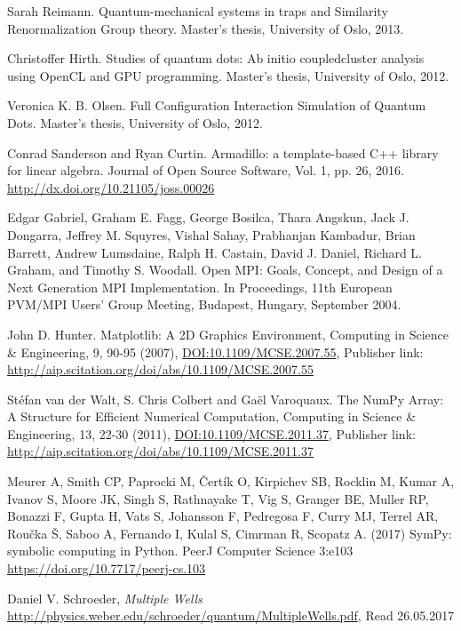 \documentclass[../main.tex]{subfiles}
\begin{document}
\begin{thebibliography}{99}
 Sarah Reimann. Quantum-mechanical systems in traps and Similarity Renormalization Group theory. Master’s thesis, University of Oslo, 2013.

 Christoffer Hirth. Studies of quantum dots: Ab initio coupledcluster analysis using OpenCL and GPU programming. Master’s thesis, University of Oslo, 2012.

 Veronica K. B. Olsen. Full Configuration Interaction Simulation of Quantum Dots. Master’s thesis, University of Oslo, 2012.

 Conrad Sanderson and Ryan Curtin. Armadillo: a template-based C++ library for linear algebra. 
Journal of Open Source Software, Vol. 1, pp. 26, 2016. \url{http://dx.doi.org/10.21105/joss.00026}

 Edgar Gabriel, Graham E. Fagg, George Bosilca, Thara Angskun, Jack J. Dongarra, Jeffrey M. Squyres, Vishal Sahay, Prabhanjan Kambadur, Brian Barrett, Andrew Lumsdaine, Ralph H. Castain, David J. Daniel, Richard L. Graham, and Timothy S. Woodall. Open MPI: Goals, Concept, and Design of a Next Generation MPI Implementation. In Proceedings, 11th European PVM/MPI Users' Group Meeting, Budapest, Hungary, September 2004.

 John D. Hunter. Matplotlib: A 2D Graphics Environment, Computing in Science \& Engineering, 9, 90-95 (2007), \href{http://dx.doi.org/10.1109/MCSE.2007.55}{DOI:10.1109/MCSE.2007.55}, Publisher link:  \url{http://aip.scitation.org/doi/abs/10.1109/MCSE.2007.55}

 Stéfan van der Walt, S. Chris Colbert and Gaël Varoquaux. The NumPy Array: A Structure for Efficient Numerical Computation, Computing in Science \& Engineering, 13, 22-30 (2011), \href{http://dx.doi.org/10.1109/MCSE.2011.37}{DOI:10.1109/MCSE.2011.37}, Publisher link:  \url{http://aip.scitation.org/doi/abs/10.1109/MCSE.2011.37}

 Meurer A, Smith CP, Paprocki M, Čertík O, Kirpichev SB, Rocklin M, Kumar A, Ivanov S, Moore JK, Singh S, Rathnayake T, Vig S, Granger BE, Muller RP, Bonazzi F, Gupta H, Vats S, Johansson F, Pedregosa F, Curry MJ, Terrel AR, Roučka Š, Saboo A, Fernando I, Kulal S, Cimrman R, Scopatz A. (2017) SymPy: symbolic computing in Python. PeerJ Computer Science 3:e103 \url{https://doi.org/10.7717/peerj-cs.103}

 Daniel V. Schroeder, \emph{Multiple Wells} \url{http://physics.weber.edu/schroeder/quantum/MultipleWells.pdf}, Read 26.05.2017



\end{thebibliography}
\end{document}

